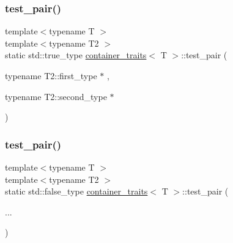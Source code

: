 \subsubsection{\texorpdfstring{test\_pair()}{test\_pair()}\hspace{0.1cm}{\footnotesize\ttfamily [1/2]}}
{\footnotesize\ttfamily template$<$typename T $>$ \\
template$<$typename T2 $>$ \\
static std\+::true\+\_\+type \mbox{\hyperlink{structcontainer__traits}{container\+\_\+traits}}$<$ T $>$\+::test\+\_\+pair (\begin{DoxyParamCaption}\item[{typename T2\+::first\+\_\+type $\ast$}]{,  }\item[{typename T2\+::second\+\_\+type $\ast$}]{ }\end{DoxyParamCaption})\hspace{0.3cm}{\ttfamily [static]}}

\mbox{\label{structcontainer__traits_afbc50d3448c347e73f94cfe1a8d1b2b8}} 
\subsubsection{\texorpdfstring{test\_pair()}{test\_pair()}\hspace{0.1cm}{\footnotesize\ttfamily [2/2]}}
{\footnotesize\ttfamily template$<$typename T $>$ \\
template$<$typename T2 $>$ \\
static std\+::false\+\_\+type \mbox{\hyperlink{structcontainer__traits}{container\+\_\+traits}}$<$ T $>$\+::test\+\_\+pair (\begin{DoxyParamCaption}\item[{}]{... }\end{DoxyParamCaption})\hspace{0.3cm}{\ttfamily [static]}}

\mbox{\label{structcontainer__traits_a00e1d17df72634112a0d82724df08e97}} 
